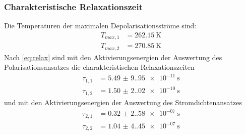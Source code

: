 \subsubsection{Charakteristische Relaxationszeit}
Die Temperaturen der maximalen Depolarisationsströme sind:
\begin{align}
    T_{max,1} &= \qty{262.15}{\kelvin} \\
    T_{max,2} &= \qty{270.85}{\kelvin}
\end{align}
Nach \autoref{eq:relax} sind mit den Aktivierungsenergien der Auswertung des Polarisationsansatzes
die charakteristischen Relaxationszeiten
\begin{align}
    \tau_{1,1} &= \qty{5.49(9.95)e-11}{\second}\\
    \tau_{1,2} &= \qty{1.50(2.02)e-10}{\second}
\end{align}
und mit den Aktivierungsenergien der Auswertung des Stromdichtenansatzes
\begin{align}
    \tau_{2,1} &= \qty{0.32(2.58)e-07}{\second}\\
    \tau_{2,2} &= \qty{1.04(4.45)e-07}{\second}
\end{align}
